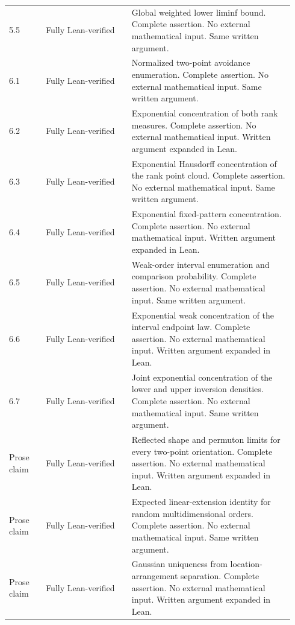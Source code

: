 \begin{longtable}{@{}p{0.12\linewidth}p{0.29\linewidth}p{0.53\linewidth}@{}}
5.5 & Fully Lean-verified & Global weighted lower liminf bound. Complete assertion. No external mathematical input. Same written argument. \\

6.1 & Fully Lean-verified & Normalized two-point avoidance enumeration. Complete assertion. No external mathematical input. Same written argument. \\

6.2 & Fully Lean-verified & Exponential concentration of both rank measures. Complete assertion. No external mathematical input. Written argument expanded in Lean. \\

6.3 & Fully Lean-verified & Exponential Hausdorff concentration of the rank point cloud. Complete assertion. No external mathematical input. Same written argument. \\

6.4 & Fully Lean-verified & Exponential fixed-pattern concentration. Complete assertion. No external mathematical input. Written argument expanded in Lean. \\

6.5 & Fully Lean-verified & Weak-order interval enumeration and comparison probability. Complete assertion. No external mathematical input. Same written argument. \\

6.6 & Fully Lean-verified & Exponential weak concentration of the interval endpoint law. Complete assertion. No external mathematical input. Written argument expanded in Lean. \\

6.7 & Fully Lean-verified & Joint exponential concentration of the lower and upper inversion densities. Complete assertion. No external mathematical input. Same written argument. \\

Prose claim & Fully Lean-verified & Reflected shape and permuton limits for every two-point orientation. Complete assertion. No external mathematical input. Written argument expanded in Lean. \\

Prose claim & Fully Lean-verified & Expected linear-extension identity for random multidimensional orders. Complete assertion. No external mathematical input. Same written argument. \\

Prose claim & Fully Lean-verified & Gaussian uniqueness from location-arrangement separation. Complete assertion. No external mathematical input. Written argument expanded in Lean. \\


\end{longtable}
